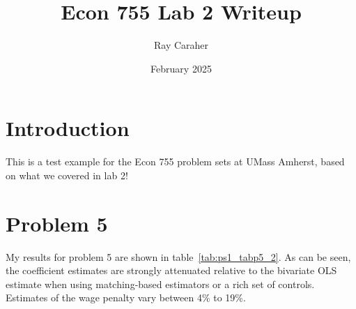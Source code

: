 \documentclass{article} %
\title{Econ 755 Lab 2 Writeup}
\author{Ray Caraher}
\date{February 2025}
\begin{document}
\maketitle



\section{Introduction}
\label{sec:intro} %

This is a test example for the Econ 755 problem sets at UMass Amherst,
based on what we covered in lab 2!






\section{Problem 5}
\label{sec:prob5}

My results for problem 5 are shown in table~\ref{tab:ps1_tabp5_2}.
As can be seen, 
the coefficient estimates are strongly attenuated relative to the bivariate OLS estimate when using matching-based estimators or a rich set of controls.
Estimates of the wage penalty vary between 4\% to 19\%.
\end{document}
